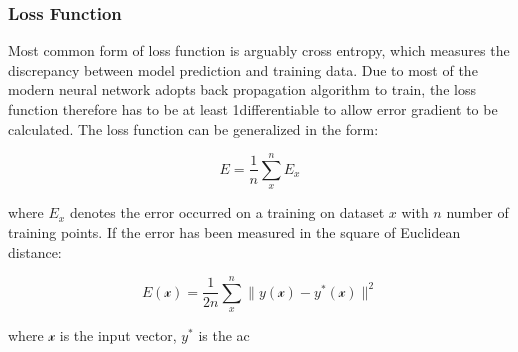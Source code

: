 \subsubsection{Loss Function}

Most common form of loss function is arguably cross entropy, which measures the discrepancy between model prediction and training data. Due to most of the modern neural network adopts back propagation algorithm to train, the loss function therefore has to be at least 1\textdegree differentiable to allow error gradient to be calculated. The loss function can be generalized in the form:

\begin{equation}
    E = \frac {1}{n} \sum_x^n E_x
\end{equation}

where $E_x$ denotes the error occurred on a training on dataset $x$ with $n$ number of training points. If the error has been measured in the square of Euclidean distance:

\begin{equation}
    E(\mathcal{x}) = \frac {1}{2n} \sum_x^n \parallel y(\mathcal{x}) - y^*(\mathcal{x}) \parallel^2 
\end{equation}

where $\mathcal{x}$ is the input vector, $y^*$ is the ac 
\par 
